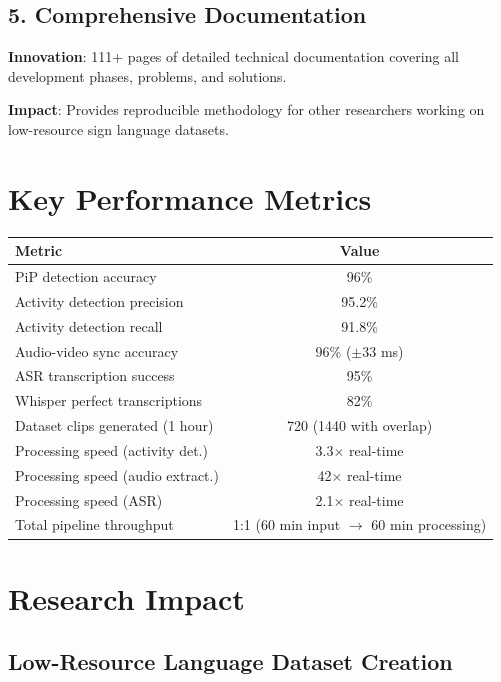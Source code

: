 \documentclass[11pt,a4paper]{article}
\begin{document}
\subsection{5. Comprehensive Documentation}

\textbf{Innovation}: 111+ pages of detailed technical documentation covering all development phases, problems, and solutions.

\textbf{Impact}: Provides reproducible methodology for other researchers working on low-resource sign language datasets.

\section{Key Performance Metrics}

\begin{center}
\begin{tabular}{@{}lc@{}}
\toprule
\textbf{Metric} & \textbf{Value} \\ \midrule
PiP detection accuracy & 96\% \\
Activity detection precision & 95.2\% \\
Activity detection recall & 91.8\% \\
Audio-video sync accuracy & 96\% ($\pm$33 ms) \\
ASR transcription success & 95\% \\
Whisper perfect transcriptions & 82\% \\
Dataset clips generated (1 hour) & 720 (1440 with overlap) \\
Processing speed (activity det.) & 3.3$\times$ real-time \\
Processing speed (audio extract.) & 42$\times$ real-time \\
Processing speed (ASR) & 2.1$\times$ real-time \\
Total pipeline throughput & 1:1 (60 min input $\rightarrow$ 60 min processing) \\
\bottomrule
\end{tabular}
\end{center}

\section{Research Impact}

\subsection{Low-Resource Language Dataset Creation}
\end{document}
